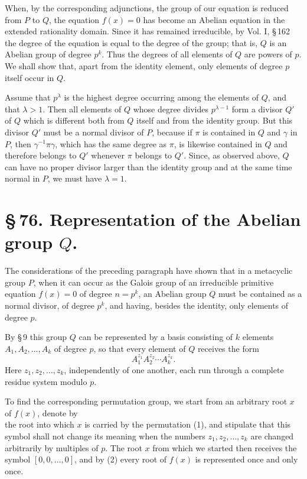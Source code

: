 \documentclass[11pt]{article}
\begin{document}
When, by the corresponding adjunctions, the group of our equation is reduced from $P$ to $Q$, the equation $f(x)=0$ has become an Abelian equation in the extended rationality domain. Since it has remained irreducible, by Vol. I, \S\,162 the degree of the equation is equal to the degree of the group; that is, $Q$ is an Abelian group of degree $p^k$. Thus the degrees of all elements of $Q$ are powers of $p$. We shall show that, apart from the identity element, only elements of degree $p$ itself occur in $Q$.

Assume that $p^\lambda$ is the highest degree occurring among the elements of $Q$, and that $\lambda>1$. Then all elements of $Q$ whose degree divides $p^{\lambda-1}$ form a divisor $Q'$ of $Q$ which is different both from $Q$ itself and from the identity group. But this divisor $Q'$ must be a normal divisor of $P$, because if $\pi$ is contained in $Q$ and $\gamma$ in $P$, then $\gamma^{-1}\pi\gamma$, which has the same degree as $\pi$, is likewise contained in $Q$ and therefore belongs to $Q'$ whenever $\pi$ belongs to $Q'$. Since, as observed above, $Q$ can have no proper divisor larger than the identity group and at the same time normal in $P$, we must have $\lambda=1$.

\section*{\S\,76. Representation of the Abelian group $Q$.}

The considerations of the preceding paragraph have shown that in a metacyclic group $P$, when it can occur as the Galois group of an irreducible primitive equation $f(x)=0$ of degree $n=p^k$, an Abelian group $Q$ must be contained as a normal divisor, of degree $p^k$, and having, besides the identity, only elements of degree $p$.

By \S\,9 this group $Q$ can be represented by a basis consisting of $k$ elements $A_1,A_2,\ldots,A_k$ of degree $p$, so that every element of $Q$ receives the form
\begin{equation}
 A_1^{z_1}A_2^{z_2}\cdots A_k^{z_k}.
 \tag{1}
\end{equation}
Here $z_1,z_2,\ldots,z_k$, independently of one another, each run through a complete residue system modulo $p$.

To find the corresponding permutation group, we start from an arbitrary root $x$ of $f(x)$, denote by
\begin{equation}
 [z_1,z_2,\ldots,z_k]
 \tag{2}
\end{equation}
the root into which $x$ is carried by the permutation (1), and stipulate that this symbol shall not change its meaning when the numbers $z_1,z_2,\ldots,z_k$ are changed arbitrarily by multiples of $p$. The root $x$ from which we started then receives the symbol $[0,0,\ldots,0]$, and by (2) every root of $f(x)$ is represented once and only once.
\end{document}
